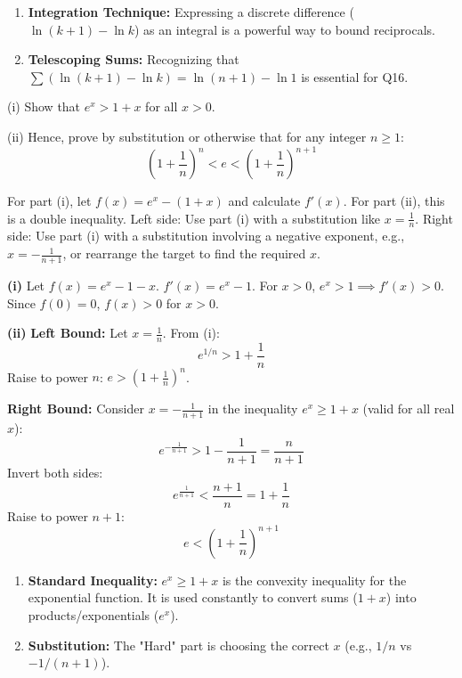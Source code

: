 \begin{takeaways}
\begin{enumerate}
    \item \textbf{Integration Technique:} Expressing a discrete difference ($\ln(k+1) - \ln k$) as an integral is a powerful way to bound reciprocals.
    \item \textbf{Telescoping Sums:} Recognizing that $\sum (\ln(k+1) - \ln k) = \ln(n+1) - \ln 1$ is essential for Q16.
\end{enumerate}
\end{takeaways}

\begin{problem}
(i) Show that $e^x > 1+x$ for all $x > 0$.

(ii) Hence, prove by substitution or otherwise that for any integer $n \ge 1$:
\[ \left( 1 + \frac{1}{n} \right)^n < e < \left( 1 + \frac{1}{n} \right)^{n+1} \]
\end{problem}

\begin{hint}
For part (i), let $f(x) = e^x - (1+x)$ and calculate $f'(x)$.
For part (ii), this is a double inequality.
Left side: Use part (i) with a substitution like $x = \frac{1}{n}$.
Right side: Use part (i) with a substitution involving a negative exponent, e.g., $x = -\frac{1}{n+1}$, or rearrange the target to find the required $x$.
\end{hint}

\begin{solution}
\textbf{(i)} Let $f(x) = e^x - 1 - x$. $f'(x) = e^x - 1$. For $x>0$, $e^x > 1 \implies f'(x) > 0$. Since $f(0)=0$, $f(x) > 0$ for $x>0$.

\textbf{(ii)}
\textbf{Left Bound:} Let $x = \frac{1}{n}$. From (i):
\[ e^{1/n} > 1 + \frac{1}{n} \]
Raise to power $n$: $e > (1 + \frac{1}{n})^n$.

\textbf{Right Bound:} Consider $x = -\frac{1}{n+1}$ in the inequality $e^x \ge 1+x$ (valid for all real $x$):
\[ e^{-\frac{1}{n+1}} > 1 - \frac{1}{n+1} = \frac{n}{n+1} \]
Invert both sides:
\[ e^{\frac{1}{n+1}} < \frac{n+1}{n} = 1 + \frac{1}{n} \]
Raise to power $n+1$:
\[ e < \left( 1 + \frac{1}{n} \right)^{n+1} \]
\end{solution}

\begin{takeaways}
\begin{enumerate}
    \item \textbf{Standard Inequality:} $e^x \ge 1+x$ is the convexity inequality for the exponential function. It is used constantly to convert sums ($1+x$) into products/exponentials ($e^x$).
    \item \textbf{Substitution:} The "Hard" part is choosing the correct $x$ (e.g., $1/n$ vs $-1/(n+1)$).
\end{enumerate}
\end{takeaways}

